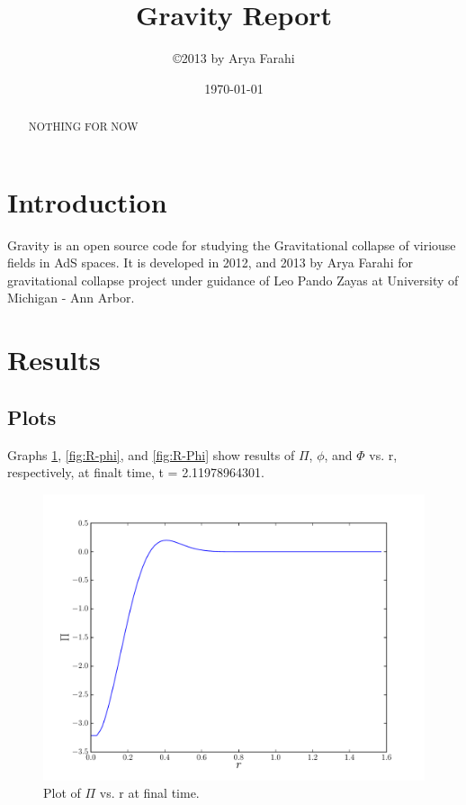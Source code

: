 \documentclass[12pt]{article}
\title{Gravity Report}
\author{\copyright 2013 by Arya Farahi}
\date{\today}
\begin{document}
\maketitle

\begin{abstract}
NOTHING FOR NOW
\end{abstract}


\section{Introduction}

Gravity is an open source code for studying the Gravitational collapse of viriouse fields in AdS spaces. It is developed in 2012, and 2013 by Arya Farahi for gravitational collapse project under guidance of Leo Pando Zayas at University of Michigan - Ann Arbor. 
\section{Results}
\subsection{Plots}

Graphs \ref{fig:R-Pi}, \ref{fig:R-phi}, and \ref{fig:R-Phi} show results of $\Pi$, $\phi$, and $\Phi$ vs. r, respectively, at finalt time, t =  2.11978964301.

\begin{figure}[hbt]
 \centering
 \includegraphics[width=12cm]{PivrR.pdf}
 \caption{Plot of $\Pi$ vs. r at final time.}
 \label{fig:R-Pi}
\end{figure}
\end{document}
